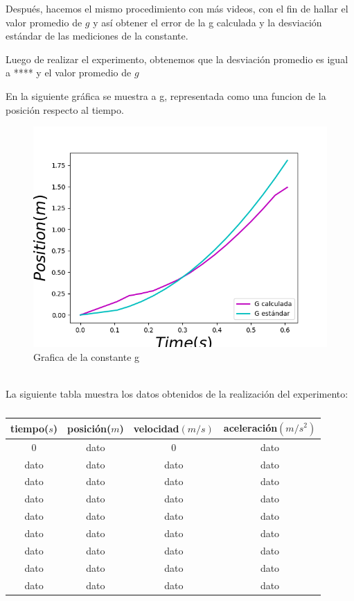 \documentclass[12pt]{article}
\begin{document}
Después, hacemos el mismo procedimiento con más videos, con el fin de hallar el valor promedio de $\textstyle{g}$ y así obtener el error de la g calculada y la desviación estándar de las mediciones de la constante.

Luego de realizar el experimento, obtenemos que la desviación promedio es igual a **** y el valor promedio de $\textstyle{g}$ 

En la siguiente gráfica se muestra a g, representada como una funcion de la posición respecto al tiempo.
\begin{figure}[h]
	\centering
	\includegraphics[scale=0.8]{Grafica.png}
	\caption{Grafica de la constante g}
	\label{graph1}
\end{figure}
\\







La siguiente tabla muestra los datos obtenidos de la realización del experimento:

\begin{table}[h]
	\centering
	\begin{tabular}{|c|c|c|c|}
		\hline
		tiempo($s$) & posición($m$) & velocidad$(m/s)$ & aceleración$(m/s^{2})$ \\
		\hline\hline
		0 & dato & 0 & dato \\
		\hline
		dato & dato & dato & dato \\
		\hline
		dato & dato & dato & dato \\
		\hline
		dato & dato & dato & dato \\
		\hline
		dato & dato & dato & dato \\
		\hline
		dato & dato & dato & dato \\
		\hline
		dato & dato & dato & dato \\
		\hline
		dato & dato & dato & dato \\
		\hline
		dato & dato & dato & dato \\
		\hline
	\end{tabular}
	\caption{}
	\label{table1}
\end{table}
\end{document}
